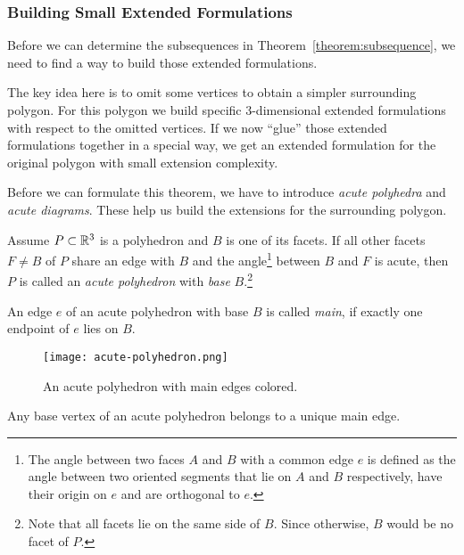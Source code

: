 \subsubsection{Building Small Extended Formulations}

Before we can determine the subsequences in Theorem~\ref{theorem:subsequence}, we need to find a way to build those extended formulations.

The key idea here is to omit some vertices to obtain a simpler surrounding polygon. For this polygon we build specific 3-dimensional extended formulations with respect to the omitted vertices. If we now ``glue'' those extended formulations together in a special way, we get an extended formulation for the original polygon with small extension complexity.

Before we can formulate this theorem, we have to introduce \emph{acute polyhedra} and \emph{acute diagrams}. These help us build the extensions for the surrounding polygon.

\begin{definition}\label{definition:acute-polyhedron}
  Assume $P \subset \mathbb{R}^3$ is a polyhedron and $B$ is one of its facets. If all other facets $F \neq B$ of $P$
  share an edge with $B$ and
  the angle\footnote{The angle between two faces $A$ and $B$ with a common edge $e$ is defined as the angle between two oriented segments that lie on $A$ and $B$ respectively, have their origin on $e$ and are orthogonal to $e$.} between $B$ and $F$ is acute,
  then $P$ is called an \emph{acute polyhedron} with \emph{base} $B$.\footnote{Note that all facets lie on the same side of $B$. Since otherwise, $B$ would be no facet of $P$.}
\end{definition}

\begin{definition}
  An edge $e$ of an acute polyhedron with base $B$ is called \emph{main}, if exactly one endpoint of $e$ lies on $B$.
\end{definition}

\begin{figure}[ht]
  \centering
  \texttt{[image: acute-polyhedron.png]}
  \caption{An acute polyhedron with main edges colored.}
  \label{fig:acute-polyhedron}
\end{figure}

\begin{lemma}
  Any base vertex of an acute polyhedron belongs to a unique main edge.
\end{lemma}

